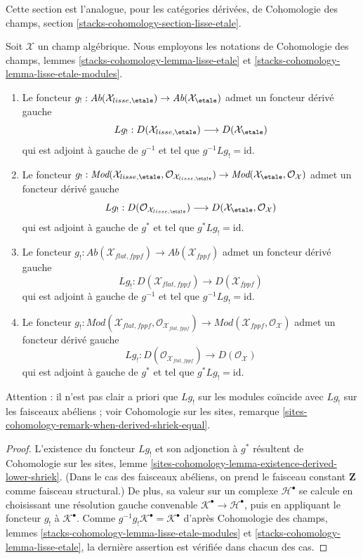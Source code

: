 \noindent
Cette section est l'analogue, pour les catégories dérivées, de Cohomologie des
champs, section \ref{stacks-cohomology-section-lisse-etale}.

\begin{lemma}
\label{lemma-shriek-derived}
Soit $\mathcal{X}$ un champ algébrique. Nous employons les notations de
Cohomologie des champs, lemmes
\ref{stacks-cohomology-lemma-lisse-etale} et
\ref{stacks-cohomology-lemma-lisse-etale-modules}.
\begin{enumerate}
\item Le foncteur
$g_! : \textit{Ab}(\mathcal{X}_{lisse,\etale}) \to
\textit{Ab}(\mathcal{X}_\etale)$
admet un foncteur dérivé gauche
$$
Lg_! :
D(\mathcal{X}_{lisse,\etale})
\longrightarrow
D(\mathcal{X}_\etale)
$$
qui est adjoint à gauche de $g^{-1}$ et tel que
$g^{-1}Lg_! = \text{id}$.
\item Le foncteur $g_! :
\textit{Mod}(\mathcal{X}_{lisse,\etale},
\mathcal{O}_{\mathcal{X}_{lisse,\etale}}) \to
\textit{Mod}(\mathcal{X}_\etale, \mathcal{O}_{\mathcal{X}})$
admet un foncteur dérivé gauche
$$
Lg_! :
D(\mathcal{O}_{\mathcal{X}_{lisse,\etale}})
\longrightarrow
D(\mathcal{X}_\etale, \mathcal{O}_\mathcal{X})
$$
qui est adjoint à gauche de $g^*$ et tel que $g^*Lg_! = \text{id}$.
\item Le foncteur $g_! : \textit{Ab}(\mathcal{X}_{flat,fppf}) \to
\textit{Ab}(\mathcal{X}_{fppf})$
admet un foncteur dérivé gauche
$$
Lg_! :
D(\mathcal{X}_{flat, fppf})
\longrightarrow
D(\mathcal{X}_{fppf})
$$
qui est adjoint à gauche de $g^{-1}$ et tel que
$g^{-1}Lg_! = \text{id}$.
\item Le foncteur $g_! :
\textit{Mod}(\mathcal{X}_{flat,fppf},
\mathcal{O}_{\mathcal{X}_{flat,fppf}}) \to
\textit{Mod}(\mathcal{X}_{fppf}, \mathcal{O}_{\mathcal{X}})$
admet un foncteur dérivé gauche
$$
Lg_! :
D(\mathcal{O}_{\mathcal{X}_{flat, fppf}})
\longrightarrow
D(\mathcal{O}_\mathcal{X})
$$
qui est adjoint à gauche de $g^*$ et tel que $g^*Lg_! = \text{id}$.
\end{enumerate}
Attention : il n'est pas clair a priori que $Lg_!$ sur les modules coïncide avec
$Lg_!$ sur les faisceaux abéliens ; voir Cohomologie sur les sites, remarque
\ref{sites-cohomology-remark-when-derived-shriek-equal}.
\end{lemma}

\begin{proof}
L'existence du foncteur $Lg_!$ et son adjonction à $g^*$ résultent de
Cohomologie sur les sites, lemme
\ref{sites-cohomology-lemma-existence-derived-lower-shriek}. (Dans le cas des
faisceaux abéliens, on prend le faisceau constant $\mathbf{Z}$ comme faisceau
structural.) De plus, sa valeur sur un complexe $\mathcal{H}^\bullet$ se calcule
en choisissant une résolution gauche convenable
$\mathcal{K}^\bullet \to \mathcal{H}^\bullet$, puis en appliquant le foncteur
$g_!$ à $\mathcal{K}^\bullet$. Comme
$g^{-1}g_!\mathcal{K}^\bullet = \mathcal{K}^\bullet$ d'après Cohomologie des
champs, lemmes \ref{stacks-cohomology-lemma-lisse-etale-modules} et
\ref{stacks-cohomology-lemma-lisse-etale}, la dernière assertion est vérifiée
dans chacun des cas.
\end{proof}

